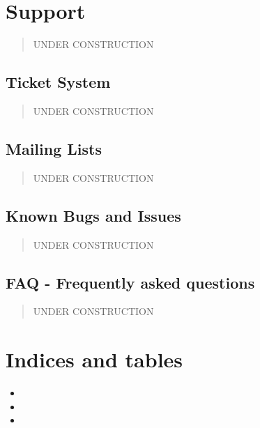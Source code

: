 \documentclass[letterpaper,10pt,english]{sphinxmanual}
\begin{document}
\chapter{Support}
\label{\detokenize{support:support}}\label{\detokenize{support::doc}}\begin{quote}

UNDER CONSTRUCTION
\end{quote}


\section{Ticket System}
\label{\detokenize{support/ticket_system:ticket-system}}\label{\detokenize{support/ticket_system::doc}}\begin{quote}

UNDER CONSTRUCTION
\end{quote}


\section{Mailing Lists}
\label{\detokenize{support/mailing_list:mailing-lists}}\label{\detokenize{support/mailing_list::doc}}\begin{quote}

UNDER CONSTRUCTION
\end{quote}


\section{Known Bugs and Issues}
\label{\detokenize{support/known_bugs_issues:known-bugs-and-issues}}\label{\detokenize{support/known_bugs_issues::doc}}\begin{quote}

UNDER CONSTRUCTION
\end{quote}


\section{FAQ - Frequently asked questions}
\label{\detokenize{support/faq:faq-frequently-asked-questions}}\label{\detokenize{support/faq::doc}}\begin{quote}

UNDER CONSTRUCTION
\end{quote}


\chapter{Indices and tables}
\label{\detokenize{index:indices-and-tables}}\begin{itemize}
\item {} 

\item {} 

\item {} 

\end{itemize}
\end{document}
